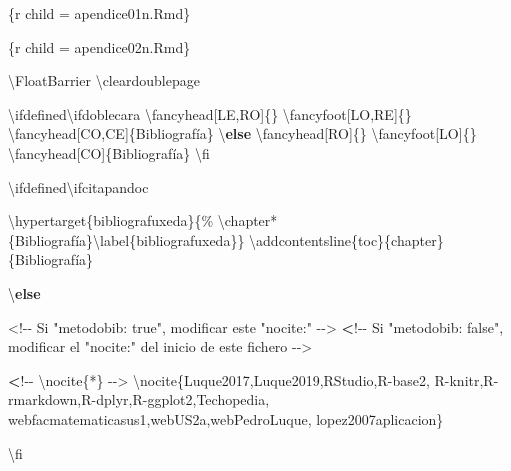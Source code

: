 \documentclass[11pt,a4paper,oneside,]{article}
\newenvironment{Shaded}{\begin{snugshade}}{\end{snugshade}}
\newcommand{\AttributeTok}[1]{\textcolor[rgb]{0.77,0.63,0.00}{#1}}
\newcommand{\ControlFlowTok}[1]{\textcolor[rgb]{0.13,0.29,0.53}{\textbf{#1}}}
\newcommand{\ErrorTok}[1]{\textcolor[rgb]{0.64,0.00,0.00}{\textbf{#1}}}
\newcommand{\NormalTok}[1]{#1}
\newcommand{\OtherTok}[1]{\textcolor[rgb]{0.56,0.35,0.01}{#1}}
\newcommand{\SpecialCharTok}[1]{\textcolor[rgb]{0.00,0.00,0.00}{#1}}
\newcommand{\StringTok}[1]{\textcolor[rgb]{0.31,0.60,0.02}{#1}}
\numberwithin{dummy}{section}
\theoremstyle{ocrenumbox}
\theoremstyle{blacknumex}
\theoremstyle{blacknumbox}
\theoremstyle{ocrenum}
\theoremstyle{ocrenum}
\begin{document}
\begin{Shaded}
\begin{Highlighting}[numbers=left,,]
\StringTok{\textasciigrave{}\textasciigrave{}\textasciigrave{}}\AttributeTok{\{r child = \textquotesingle{}apendice01n.Rmd\textquotesingle{}\}}
\StringTok{\textasciigrave{}\textasciigrave{}\textasciigrave{}}

\StringTok{\textasciigrave{}\textasciigrave{}\textasciigrave{}}\AttributeTok{\{r child = \textquotesingle{}apendice02n.Rmd\textquotesingle{}\}}
\StringTok{\textasciigrave{}\textasciigrave{}\textasciigrave{}}




\NormalTok{\textbackslash{}FloatBarrier}
\NormalTok{\textbackslash{}cleardoublepage}

\NormalTok{\textbackslash{}ifdefined\textbackslash{}ifdoblecara}
\NormalTok{  \textbackslash{}fancyhead[LE,RO]\{\}}
\NormalTok{  \textbackslash{}fancyfoot[LO,RE]\{\}}
\NormalTok{  \textbackslash{}fancyhead[CO,CE]\{Bibliografía\}}
\NormalTok{\textbackslash{}}\ControlFlowTok{else}
\NormalTok{  \textbackslash{}fancyhead[RO]\{\}}
\NormalTok{  \textbackslash{}fancyfoot[LO]\{\}}
\NormalTok{  \textbackslash{}fancyhead[CO]\{Bibliografía\}}
\NormalTok{\textbackslash{}fi}


\NormalTok{\textbackslash{}ifdefined\textbackslash{}ifcitapandoc}

\NormalTok{\textbackslash{}hypertarget\{bibliografuxeda\}\{\%}
\NormalTok{\textbackslash{}chapter}\SpecialCharTok{*}\NormalTok{\{Bibliografía\}\textbackslash{}label\{bibliografuxeda\}\}}
\NormalTok{\textbackslash{}addcontentsline\{toc\}\{chapter\}\{Bibliografía\}}


\NormalTok{\textbackslash{}}\ControlFlowTok{else}

\SpecialCharTok{\textless{}!{-}{-}}\NormalTok{ Si }\StringTok{"metodobib: true"}\NormalTok{, modificar este }\StringTok{"nocite:"}  \SpecialCharTok{{-}}\OtherTok{{-}\textgreater{}}
\ErrorTok{\textless{}}\SpecialCharTok{!{-}{-}}\NormalTok{ Si }\StringTok{"metodobib: false"}\NormalTok{, modificar el }\StringTok{"nocite:"}\NormalTok{ del inicio de este fichero  }\SpecialCharTok{{-}}\OtherTok{{-}\textgreater{}}

\ErrorTok{\textless{}}\SpecialCharTok{!{-}{-}}\NormalTok{ \textbackslash{}nocite\{}\SpecialCharTok{*}\NormalTok{\} }\SpecialCharTok{{-}}\OtherTok{{-}\textgreater{}}
\NormalTok{\textbackslash{}nocite\{Luque2017,Luque2019,RStudio,R}\SpecialCharTok{{-}}\NormalTok{base2,}
\NormalTok{R}\SpecialCharTok{{-}}\NormalTok{knitr,R}\SpecialCharTok{{-}}\NormalTok{rmarkdown,R}\SpecialCharTok{{-}}\NormalTok{dplyr,R}\SpecialCharTok{{-}}\NormalTok{ggplot2,Techopedia,}
\NormalTok{webfacmatematicasus1,webUS2a,webPedroLuque,}
\NormalTok{lopez2007aplicacion\}}

\NormalTok{\textbackslash{}fi }
\end{Highlighting}
\end{Shaded}
\end{document}
